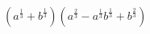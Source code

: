 $(a^{\frac{1}{3}}+b^{\frac{1}{3}})(a^{\frac{2}{3}}-a^{\frac{1}{3}}b^{\frac{1}{3}}+b^{\frac{2}{3}})$
